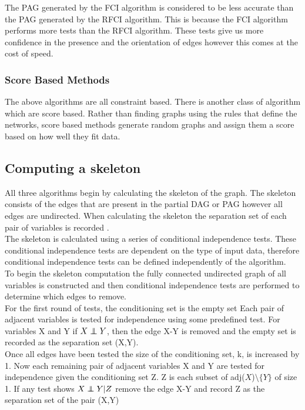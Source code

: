\documentclass{article}
\newcommand\independent{\protect\mathpalette{\protect\independenT}{\perp}}
\def\independenT#1#2{\mathrel{\rlap{$#1#2$}\mkern2mu{#1#2}}}
\begin{document}
The PAG generated by the FCI algorithm is considered to be less accurate than the PAG generated by the RFCI algorithm. This is because the FCI algorithm performs more tests than the RFCI algorithm. These tests give us more confidence in the presence and the orientation of edges however this comes at the cost of speed.
\\
\subsubsection{Score Based Methods}
The above algorithms are all constraint based. There is another class of algorithm which are score based. Rather than finding graphs using the rules that define the networks, score based methods generate random graphs and assign them a score based on how well they fit data.\\

   
\subsection{Computing a skeleton}
All three algorithms begin by calculating the skeleton of the graph. The skeleton consists of the edges that are present in the partial DAG or PAG however all edges are undirected. When calculating the skeleton the separation set of each pair of variables is recorded \cite{colombo2012learning, spirtes1991algorithm}.
\\

The skeleton is calculated using a series of conditional independence tests. These conditional independence tests are dependent on the type of input data, therefore conditional independence tests can be defined independently of the algorithm.
\\

To begin the skeleton computation the fully connected undirected graph of all variables is constructed and then conditional independence tests are performed to determine which edges to remove.
\\

For the first round of tests, the conditioning set is the empty set Each pair of adjacent variables is tested for independence using some predefined test. For variables X and Y if $X \independent Y$, then the edge X-Y is removed and the empty set is recorded as the separation set (X,Y).
\\

Once all edges have been tested the size of the conditioning set, k, is increased by 1. Now each remaining pair of adjacent variables X and Y are tested for independence given the conditioning set Z. Z is each subset of adj($X$)$\setminus \{Y\}$ of size 1. If any test shows $X \independent Y | Z$ remove the edge X-Y and record Z as the separation set of the pair (X,Y) 
\\
\end{document}
